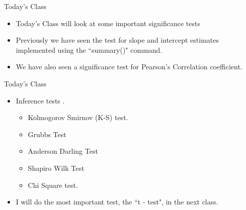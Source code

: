 \documentclass[pdf,default,slideColor,colorBG]{prosper}
\begin{document}
\begin{slide}{Today's Class}


\begin{itemize}
\item Today's Class will look at some important significance tests
\item Previously we have seen the test for slope and intercept estimates implemented using the ``summary()" command.
\item We have also seen a significance test for Pearson's Correlation coefficient.
\end{itemize}

\end{slide}

\begin{slide}{Today's Class}

\begin{itemize}
\item Inference tests .
\begin{itemize}
\item Kolmogorov Smirnov (K-S) test.
\item Grubbs Test
\item Anderson Darling Test
\item Shapiro Wilk Test
\item Chi Square test.
\end{itemize}
\item I will do the most important test, the ``t - test", in the next class.
\end{itemize}

\end{slide}
\end{document}
